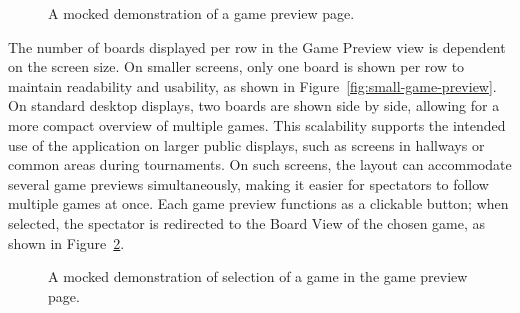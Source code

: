 \begin{figure}[h!] \centering {}\caption[Preview of active games]{A mocked demonstration of a game preview page.}\label{fig:game-preview} \end{figure}

The number of boards displayed per row in the Game Preview view is dependent on the screen size. On smaller screens, only one board is shown per row to maintain readability and usability, as shown in Figure~\ref{fig:small-game-preview}. On standard desktop displays, two boards are shown side by side, allowing for a more compact overview of multiple games. This scalability supports the intended use of the application on larger public displays, such as screens in hallways or common areas during tournaments. On such screens, the layout can accommodate several game previews simultaneously, making it easier for spectators to follow multiple games at once. Each game preview functions as a clickable button; when selected, the spectator is redirected to the Board View of the chosen game, as shown in Figure~\ref{fig:game-preview-selection}.\\

\begin{figure}[h!] \centering {}\caption[Preview of selected game]{A mocked demonstration of selection of a game in the game preview page.}\label{fig:game-preview-selection} \end{figure}

